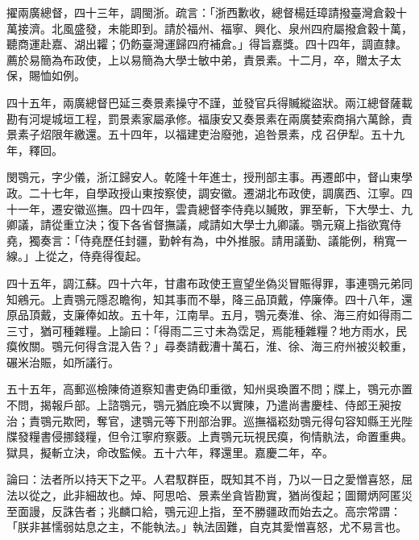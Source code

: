 \begin{pinyinscope}
擢兩廣總督，四十三年，調閩浙。疏言：「浙西歉收，總督楊廷璋請撥臺灣倉穀十萬接濟。北風盛發，未能即到。請於福州、福寧、興化、泉州四府屬撥倉穀十萬，聽商運赴嘉、湖出糶；仍飭臺灣運歸四府補倉。」得旨嘉獎。四十四年，調直隸。薦於易簡為布政使，上以易簡為大學士敏中弟，責景素。十二月，卒，贈太子太保，賜恤如例。

四十五年，兩廣總督巴延三奏景素操守不謹，並發官兵得贓縱盜狀。兩江總督薩載勘有河堤城垣工程，罰景素家屬承修。福康安又奏景素在兩廣婪索商捐六萬餘，責景素子炤限年繳還。五十四年，以福建吏治廢弛，追咎景素，戍召伊犁。五十九年，釋回。

閔鶚元，字少儀，浙江歸安人。乾隆十年進士，授刑部主事。再遷郎中，督山東學政。二十七年，自學政授山東按察使，調安徽。遷湖北布政使，調廣西、江寧。四十一年，遷安徽巡撫。四十四年，雲貴總督李侍堯以贓敗，罪至斬，下大學士、九卿議，請從重立決；復下各省督撫議，咸請如大學士九卿議。鶚元窺上指欲寬侍堯，獨奏言：「侍堯歷任封疆，勤幹有為，中外推服。請用議勤、議能例，稍寬一線。」上從之，侍堯得復起。

四十五年，調江蘇。四十六年，甘肅布政使王亶望坐偽災冒賑得罪，事連鶚元弟同知鵷元。上責鶚元隱忍瞻徇，知其事而不舉，降三品頂戴，停廉俸。四十八年，還原品頂戴，支廉俸如故。五十年，江南旱。五月，鶚元奏淮、徐、海三府如得雨二三寸，猶可種雜糧。上諭曰：「得雨二三寸未為霑足，焉能種雜糧？地方雨水，民瘼攸關。鶚元何得含混入告？」尋奏請截漕十萬石，淮、徐、海三府州被災較重，碾米治賑，如所議行。

五十五年，高郵巡檢陳倚道察知書吏偽印重徵，知州吳瑍置不問；牒上，鶚元亦置不問，揭報戶部。上諮鶚元，鶚元猶庇瑍不以實陳，乃遣尚書慶桂、侍郎王昶按治；責鶚元欺罔，奪官，逮鶚元等下刑部治罪。巡撫福崧劾鶚元得句容知縣王光陛牒發糧書侵挪錢糧，但令江寧府察覈。上責鶚元玩視民瘼，徇情骫法，命置重典。獄具，擬斬立決，命改監候。五十六年，釋還里。嘉慶二年，卒。

論曰：法者所以持天下之平。人君馭群臣，既知其不肖，乃以一日之愛憎喜怒，屈法以從之，此非細故也。焯、阿思哈、景素坐貪皆勘實，猶尚復起；圖爾炳阿匿災至面謾，反誅告者；兆麟口給，鶚元迎上指，至不勝疆政而始去之。高宗常謂：「朕非甚懦弱姑息之主，不能執法。」執法固難，自克其愛憎喜怒，尤不易言也。


\end{pinyinscope}
